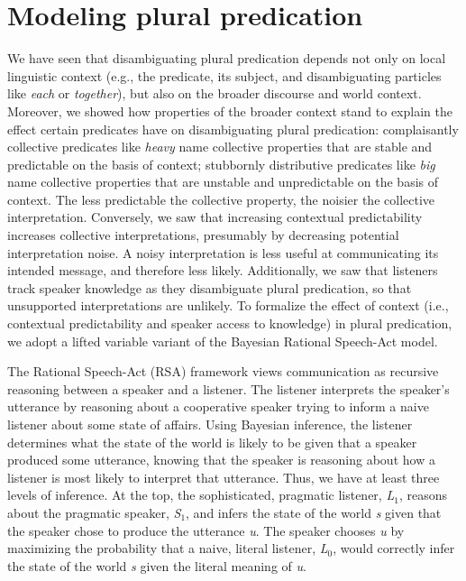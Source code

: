 \documentclass[linguex]{sp}
\begin{document}
\section{Modeling plural predication}

We have seen that disambiguating plural predication depends not only on local linguistic context (e.g., the predicate, its subject, and disambiguating particles like \emph{each} or \emph{together}), but also on the broader discourse and world context. Moreover, we showed how properties of the broader context stand to explain the effect certain predicates have on disambiguating plural predication: complaisantly collective predicates like \emph{heavy} name collective properties that are stable and predictable on the basis of context; stubbornly distributive predicates like \emph{big} name collective properties that are unstable and unpredictable on the basis of context. The less predictable the collective property, the noisier the collective interpretation. Conversely, we saw that increasing contextual predictability increases collective interpretations, presumably by decreasing potential interpretation noise. A noisy interpretation is less useful at communicating its intended message, and therefore less likely. Additionally, we saw that listeners track speaker knowledge as they disambiguate plural predication, so that unsupported interpretations are unlikely. To formalize the effect of context (i.e., contextual predictability and speaker access to knowledge) in plural predication, we adopt a lifted variable variant of the Bayesian Rational Speech-Act model. 

The Rational Speech-Act (RSA) framework views communication as recursive reasoning between a speaker and a listener. The listener interprets the speaker's utterance by reasoning about a cooperative speaker trying to inform a naive listener about some state of affairs. Using Bayesian inference, the listener determines what the state of the world is likely to be given that a speaker produced some utterance, knowing that the speaker is reasoning about how a listener is most likely to interpret that utterance. Thus, we have at least three levels of inference. At the top, the sophisticated, pragmatic listener, \emph{L}$_{1}$, reasons about the pragmatic speaker, \emph{S}$_{1}$, and infers the state of the world \emph{s} given that the speaker chose to produce the utterance \emph{u}. The speaker chooses \emph{u} by maximizing the probability that a naive, literal listener, \emph{L}$_{0}$, would correctly infer the state of the world \emph{s} given the literal meaning of \emph{u}.
\end{document}
